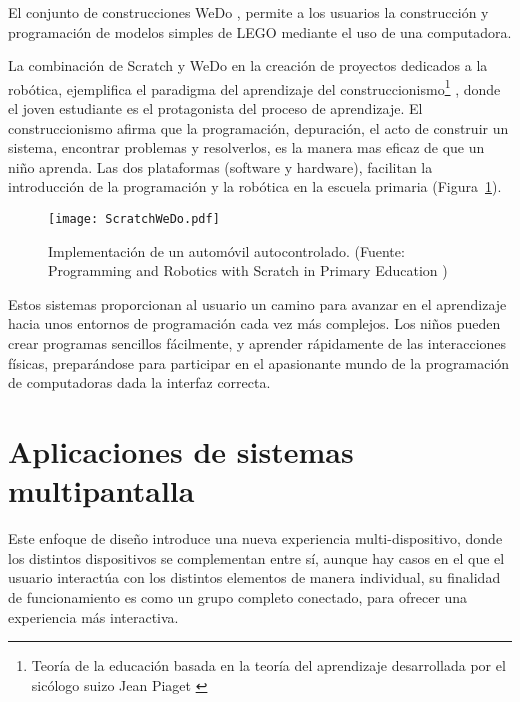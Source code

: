 El conjunto de construcciones WeDo \cite{WeDo}, permite a los usuarios la construcción y programación de modelos simples de LEGO mediante el uso de una computadora.

La combinación de Scratch y WeDo en la creación de proyectos dedicados a la robótica, ejemplifica el paradigma del aprendizaje del construccionismo\footnote{Teoría de la educación basada en la teoría del aprendizaje desarrollada por el sicólogo suizo Jean Piaget \cite{Piaget}} \cite{Papert}, donde el joven estudiante es el protagonista del proceso de aprendizaje. El construccionismo afirma que la programación, depuración, el acto de construir un sistema, encontrar problemas y resolverlos, es la manera mas eficaz de que un niño aprenda. Las dos plataformas (software y hardware), facilitan la introducción de la programación y la robótica en la escuela primaria (Figura~\ref{fig:ScratchWeDo}).

\begin{figure}[!h]
\begin{center}
\texttt{[image: ScratchWeDo.pdf]}
\caption{Implementación de un automóvil autocontrolado. (Fuente: Programming and Robotics with Scratch in Primary Education \cite{ScratchWeDo})}
\label{fig:ScratchWeDo}
\end{center}
\end{figure}



Estos sistemas proporcionan al usuario un camino para avanzar en el aprendizaje hacia unos entornos de programación cada vez más complejos. Los niños pueden crear programas sencillos fácilmente, y aprender rápidamente de las interacciones físicas, preparándose para participar en el apasionante mundo de la programación de computadoras dada la interfaz correcta.



\section{Aplicaciones de sistemas multipantalla}

Este enfoque de diseño introduce una nueva experiencia multi-dispositivo, donde los distintos dispositivos se complementan entre sí, aunque hay casos en el que el usuario interactúa con los distintos elementos de manera individual, su finalidad de funcionamiento es como un grupo completo conectado, para ofrecer una experiencia más interactiva.

